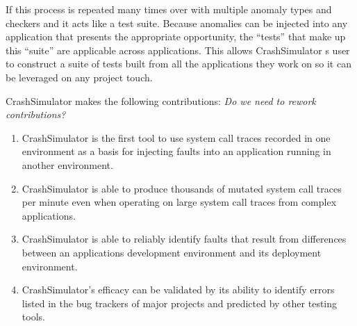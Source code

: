     If this process is repeated many times over with multiple anomaly types and checkers and it acts like a test suite.
    Because anomalies can be injected into any application that presents the appropriate opportunity, the ``tests'' that
    make up this ``suite'' are applicable across applications.  This allows CrashSimulator s user to construct a suite
    of tests built from all the applications they work on so it can be leveraged on any project  touch.

    CrashSimulator makes the following contributions: \emph{Do we need to rework contributions?}

    \begin{enumerate}
        \item{CrashSimulator is the first tool to use system call traces recorded in one environment as a basis for
            injecting faults into an application running in another environment.}
        \item{CrashSimulator is able to produce thousands of mutated system call traces per minute even when operating
            on large system call traces from complex applications.}
        \item{CrashSimulator is able to reliably identify faults that result from differences between an applications
            development environment and its deployment environment.}
        \item{CrashSimulator's efficacy can be validated by its ability to identify errors listed in the bug trackers of
            major projects and predicted by other testing tools.}
    \end{enumerate}
